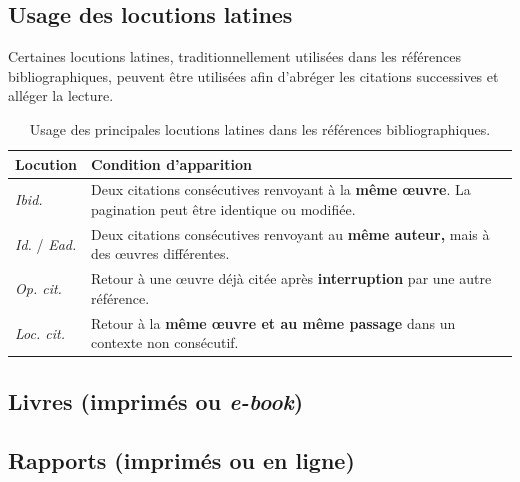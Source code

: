 \documentclass[12pt,a4paper]{article}
\begin{document}
\subsection{Usage des locutions latines}

Certaines locutions latines, traditionnellement utilisées dans les références
bibliographiques, peuvent être utilisées afin d'abréger les citations successives
et alléger la lecture.

\begin{table}[h]
	\centering
	\renewcommand{\arraystretch}{1.3}
	\begin{tabular}{|>{\centering\arraybackslash}p{3cm}|>{\centering\arraybackslash}p{6.5cm}|}
		\hline
		\textbf{Locution} &
		\textbf{Condition d'apparition} \\
		\hline

		\emph{Ibid.} &
		Deux citations consécutives renvoyant à la \textbf{même œuvre}. 
		La pagination peut être identique ou modifiée. \\
		\hline

		\emph{Id.} / \emph{Ead.} &
		Deux citations consécutives renvoyant au \textbf{même auteur,}
		mais à des œuvres différentes. \\
		\hline

		\emph{Op. cit.} &
		Retour à une œuvre déjà citée après \textbf{interruption}
		par une autre référence. \\
		\hline

		\emph{Loc. cit.} &
		Retour à la \textbf{même œuvre et au même passage}
		dans un contexte non consécutif. \\
		\hline
	\end{tabular}
	\caption{Usage des principales locutions latines dans les références bibliographiques.}
  \label{table:locutions_latines}
\end{table}

\newpage

\subsection{Livres (imprimés ou \textit{e-book})}




\subsection{Rapports (imprimés ou en ligne)}
\end{document}
